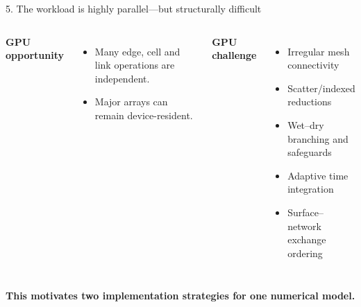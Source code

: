 \documentclass[aspectratio=169,10pt]{beamer}
\newcommand{\tightitem}{\setlength\itemsep{2pt}\setlength\parskip{0pt}}
\begin{document}
\begin{frame}{5. The workload is highly parallel---but structurally difficult}
\begin{columns}[T,onlytextwidth]
\centering
{}
\textbf{GPU opportunity}
\begin{itemize}\tightitem
\item Many edge, cell and link operations are independent.
\item Major arrays can remain device-resident.
\end{itemize}

\vspace{3mm}
\textbf{GPU challenge}
\begin{itemize}\tightitem
\item Irregular mesh connectivity
\item Scatter/indexed reductions
\item Wet--dry branching and safeguards
\item Adaptive time integration
\item Surface--network exchange ordering
\end{itemize}
\end{columns}

\vspace{3mm}
\centering\color{hfblue}\bfseries This motivates two implementation strategies for one numerical model.
\end{frame}
\end{document}
